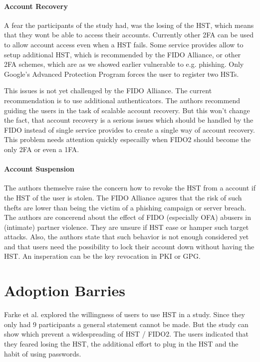 \documentclass[runningheads]{llncs}
\begin{document}
\paragraph{Account Recovery}
A fear the participants of the study had, was the losing of the HST, which means that they wont be able to access their accounts. Currently other 2FA can be used to allow account access even when a HST fails. Some service provides allow to setup additional HST, which is recommended by the FIDO Alliance, or other 2FA schemes, which are as we showed earlier vulnerable to e.g. phishing. Only Google's Advanced Protection Program forces the user to register two HSTs.

This issues is not yet challenged by the FIDO Alliance. The current recommendation is to use additional authenticators. The authors recommend guiding the users in the task of scalable account recovery. But this won't change the fact, that account recovery is a serious issues which should be handled by the FIDO instead of single service provides to create a single way of account recovery. This problem needs attention quickly especailly when FIDO2 should become the only 2FA or even a 1FA. 

\paragraph{Account Suspension}
The authors themselve raise the concern how to revoke the HST from a account if the HST of the user is stolen. The FIDO Alliance agures that the risk of such thefts are lower than being the victim of a phishing campaign or server breach. The authors are concerend about the effect of FIDO (especially OFA) abusers in (intimate) partner violence. They are unsure if HST ease or hamper such target attacks. Also, the authors state that such behavior is not enough considered yet and that users need the possibility to lock their account down without having the HST. An insperation can be the key revocation in PKI or GPG. 

\section{Adoption Barries}
Farke et al. explored the willingness of users to use HST in a study. Since they only had 9 participants a general statement cannot be made. But the study can show which prevent a widespreading of HST / FIDO2. The users indicated that they feared losing the HST, the additional effort to plug in the HST and the habit of using passwords.
\end{document}
